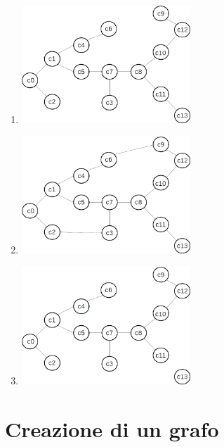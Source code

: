 \documentclass[8pt]{book}
\begin{document}
\begin{enumerate}
\begin{enumerate}
\def\labelenumi{\alph{enumi}.}
\item
  \includegraphics[width=0.50000\textwidth]{img/cellDec_grafo_es_sol1.png}
\item
  \includegraphics[width=0.50000\textwidth]{img/cellDec_grafo_es_sol2.png}
\item
  \includegraphics[width=0.50000\textwidth]{img/cellDec_grafo_es_sol3.png}
\end{enumerate}

\end{enumerate}
\newpage


\section{Creazione di un grafo}
\end{document}
